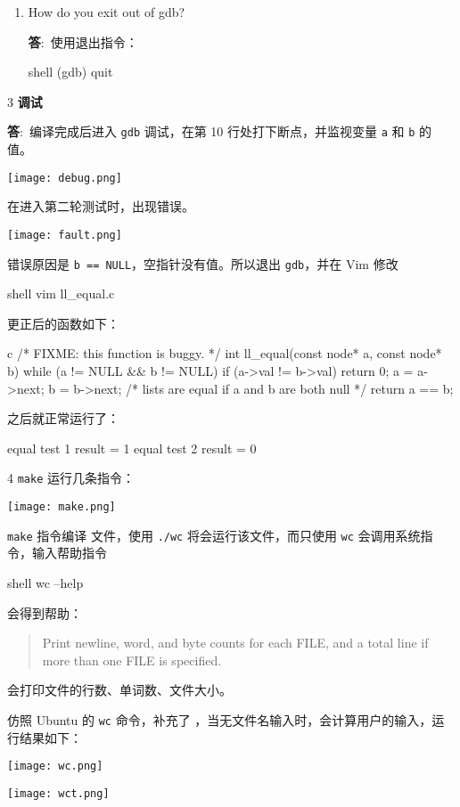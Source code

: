 \documentclass[12pt,a4paper]{article}
\newenvironment{problems}{\begin{list}{}{\renewcommand{\makelabel}[1]{\textbf{##1}.\hfil}}}{\end{list}}
\providecommand{\ans}{\textbf{答}:~}
\begin{document}
\begin{problems}
\begin{enumerate}[(1)]
        \item How do you exit out of gdb?
        
        \ans 使用退出指令：
        \begin{code}{shell}
            (gdb) quit
        \end{code}
    \end{enumerate}
    

    \item[3] \textbf{调试}
    
    \ans 编译完成后进入 \texttt{gdb} 调试，在第 10 行处打下断点，并监视变量 \texttt{a} 和 \texttt{b} 的值。

    \texttt{[image: debug.png]}

    在进入第二轮测试时，出现错误。
    
    \texttt{[image: fault.png]}

    错误原因是 \texttt{b == NULL}，空指针没有值。所以退出 \texttt{gdb}，并在 Vim 修改
    \begin{code}{shell}
        vim ll_equal.c
    \end{code}

    更正后的函数如下：

    \begin{code}{c}
/* FIXME: this function is buggy. */
int ll_equal(const node* a, const node* b) {
	while (a != NULL && b != NULL) {
		if (a->val != b->val)
			return 0;
		a = a->next;
		b = b->next;
	}
	/* lists are equal if a and b are both null */
	return a == b;
}
    \end{code}

    之后就正常运行了：
    \begin{literal}
equal test 1 result = 1
equal test 2 result = 0
    \end{literal}

    \item[4] \texttt{make}
    运行几条指令：
    
    \texttt{[image: make.png]}

    \texttt{make} 指令编译  文件，使用 \texttt{./wc} 将会运行该文件，而只使用 \texttt{wc} 会调用系统指令，输入帮助指令
    \begin{code}{shell}
        wc --help
    \end{code}
    会得到帮助：
    \begin{quote}
        Print newline, word, and byte counts for each FILE, and a total line if more than one FILE is specified.
    \end{quote}
    会打印文件的行数、单词数、文件大小。

    仿照 Ubuntu 的 \texttt{wc} 命令，补充了 ，当无文件名输入时，会计算用户的输入，运行结果如下：

    \texttt{[image: wc.png]}
    
    \texttt{[image: wct.png]}

    \inputminted[breaklines,autogobble,linenos,numbersep=1mm,frame=lines,framesep=2mm,fontsize=\scriptsize,]{c}{../lab0/wc.c}

\end{problems}
\end{document}
